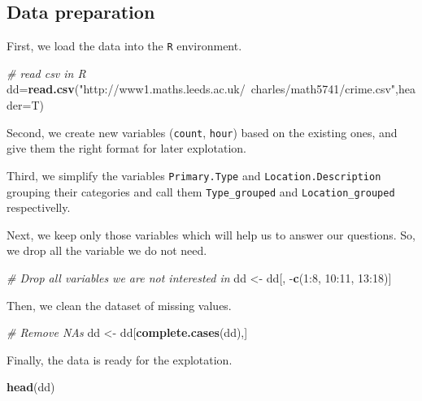 \documentclass[]{article}
\newenvironment{Shaded}{\begin{snugshade}}{\end{snugshade}}
\newcommand{\KeywordTok}[1]{\textcolor[rgb]{0.13,0.29,0.53}{\textbf{{#1}}}}
\newcommand{\DataTypeTok}[1]{\textcolor[rgb]{0.13,0.29,0.53}{{#1}}}
\newcommand{\DecValTok}[1]{\textcolor[rgb]{0.00,0.00,0.81}{{#1}}}
\newcommand{\StringTok}[1]{\textcolor[rgb]{0.31,0.60,0.02}{{#1}}}
\newcommand{\CommentTok}[1]{\textcolor[rgb]{0.56,0.35,0.01}{\textit{{#1}}}}
\newcommand{\NormalTok}[1]{{#1}}
\begin{document}
\subsection{Data preparation}\label{data-preparation}

First, we load the data into the \texttt{R} environment.

\begin{Shaded}
\begin{Highlighting}[]
\CommentTok{# read csv in R}
\NormalTok{dd=}\KeywordTok{read.csv}\NormalTok{(}\StringTok{"http://www1.maths.leeds.ac.uk/~charles/math5741/crime.csv"}\NormalTok{,}\DataTypeTok{header=}\NormalTok{T)}
\end{Highlighting}
\end{Shaded}

Second, we create new variables (\texttt{count}, \texttt{hour}) based on
the existing ones, and give them the right format for later explotation.

Third, we simplify the variables \texttt{Primary.Type} and
\texttt{Location.Description} grouping their categories and call them
\texttt{Type\_grouped} and \texttt{Location\_grouped} respectivelly.

Next, we keep only those variables which will help us to answer our
questions. So, we drop all the variable we do not need.

\begin{Shaded}
\begin{Highlighting}[]
\CommentTok{# Drop all variables we are not interested in}
\NormalTok{dd <-}\StringTok{ }\NormalTok{dd[, -}\KeywordTok{c}\NormalTok{(}\DecValTok{1}\NormalTok{:}\DecValTok{8}\NormalTok{, }\DecValTok{10}\NormalTok{:}\DecValTok{11}\NormalTok{, }\DecValTok{13}\NormalTok{:}\DecValTok{18}\NormalTok{)]}
\end{Highlighting}
\end{Shaded}

Then, we clean the dataset of missing values.

\begin{Shaded}
\begin{Highlighting}[]
\CommentTok{# Remove NAs}
\NormalTok{dd <-}\StringTok{ }\NormalTok{dd[}\KeywordTok{complete.cases}\NormalTok{(dd),]}
\end{Highlighting}
\end{Shaded}

Finally, the data is ready for the explotation.

\begin{Shaded}
\begin{Highlighting}[]
\KeywordTok{head}\NormalTok{(dd)}
\end{Highlighting}
\end{Shaded}
\end{document}
